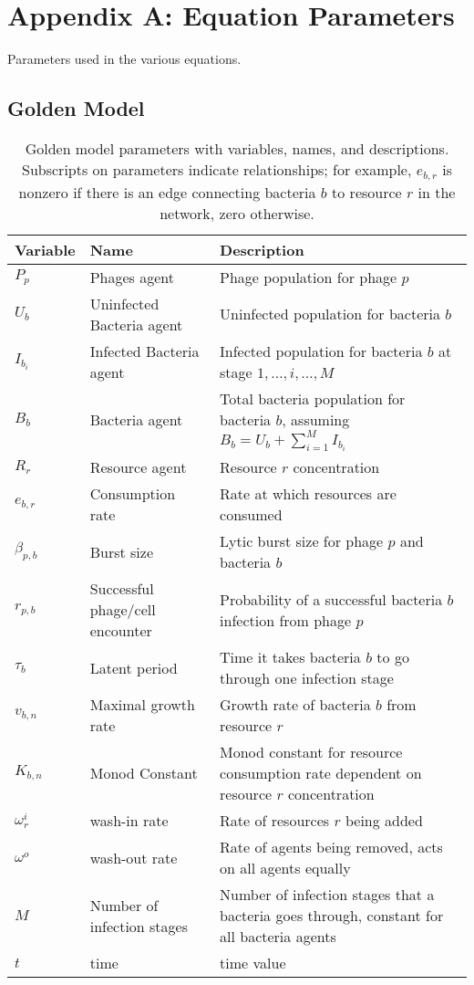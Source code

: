 \chapter{Appendix A: Equation Parameters}
\label{AppendixA}
Parameters used in the various equations. 

\section{Golden Model}
\begin{table}[htbp]
    \small %
    \centering
    \begin{tabularx}{\textwidth}{l l X}
        \toprule
        \textbf{Variable} & \textbf{Name} & \textbf{Description} \\
        \midrule
        $P_p$ & Phages agent & Phage population for phage $p$ \\
        $U_b$ & Uninfected Bacteria agent & Uninfected population for bacteria $b$ \\
        $I_{b_i}$ & Infected Bacteria agent & Infected population for bacteria $b$ at stage $1, \dots, i, \dots, M$  \\
        $B_b$ & Bacteria agent & Total bacteria population for bacteria $b$, assuming $B_b = U_b + \sum_{i=1}^M I_{b_i}$ \\
        $R_r$ & Resource agent & Resource $r$ concentration\\
        $e_{b, r}$ & Consumption rate& Rate at which resources are consumed\\
        $\beta_{p, b}$ & Burst size & Lytic burst size for phage $p$ and bacteria $b$\\
        $r_{p, b}$ & Successful phage/cell encounter & Probability of a successful bacteria $b$ infection from phage $p$\\
        $\tau_{b}$ & Latent period & Time it takes bacteria $b$ to go through one infection stage\\
        $v_{b, n}$ & Maximal growth rate & Growth rate of bacteria $b$ from resource $r$ \\
        $K_{b, n}$ & Monod Constant & Monod constant for resource consumption rate dependent on resource $r$ concentration\\
        $\omega^i_r$ & wash-in rate & Rate of resources $r$ being added\\
        $\omega^o$ & wash-out rate & Rate of agents being removed, acts on all agents equally\\
        $M$ & Number of infection stages & Number of infection stages that a bacteria goes through, constant for all bacteria agents\\
        $t$ & time & time value \\
        \bottomrule
    \end{tabularx}\newline
    \caption{
        Golden model parameters with variables, names, and descriptions. 
        Subscripts on parameters indicate relationships; for example, $e_{b, r}$ is nonzero if there is an edge connecting bacteria $b$ to resource $r$ in the network, zero otherwise.
    }
    \label{tab:parameter_table_golden_model}
\end{table}


